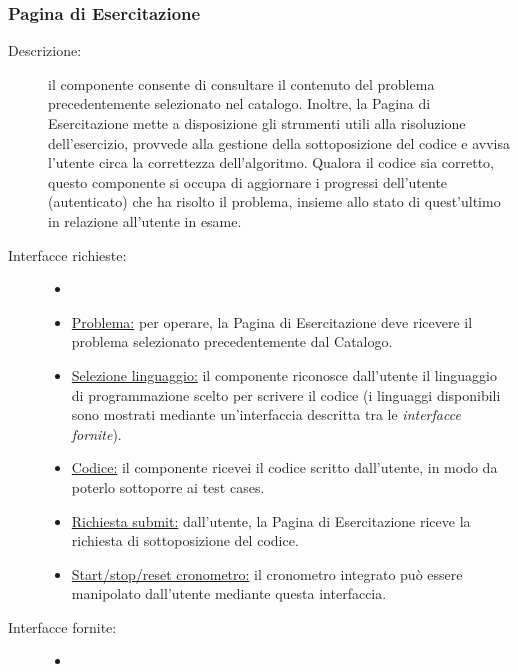 \documentclass[11pt, a4paper]{article}
\theoremstyle{definition} %
\begin{document}
\subsubsection{Pagina di Esercitazione}
\begin{description}
    \item[Descrizione:] il componente consente di consultare il contenuto del problema
    precedentemente selezionato nel catalogo. Inoltre, la Pagina di Esercitazione mette
    a disposizione gli strumenti utili alla risoluzione dell'esercizio, provvede alla
    gestione della sottoposizione del codice e avvisa l'utente circa la correttezza dell'algoritmo.
    Qualora il codice sia corretto, questo componente si occupa di aggiornare i progressi
    dell'utente (autenticato) che ha risolto il problema, insieme allo stato di quest'ultimo
    in relazione all'utente in esame.

    \item[Interfacce richieste:]
    \begin{itemize}
        \item[]

        \item \underline{Problema:} per operare, la Pagina di Esercitazione
        deve ricevere il problema selezionato precedentemente dal Catalogo.

        \item \underline{Selezione linguaggio:} il componente riconosce dall'utente il
        linguaggio di programmazione scelto per scrivere il codice (i linguaggi disponibili
        sono mostrati mediante un'interfaccia descritta tra le \textit{interfacce fornite}).

        \item \underline{Codice:} il componente ricevei il codice scritto
        dall'utente, in modo da poterlo sottoporre ai test cases.

        \item \underline{Richiesta submit:} dall'utente, la Pagina di Esercitazione
        riceve la richiesta di sottoposizione del codice.

        \item \underline{Start/stop/reset cronometro:} il cronometro integrato
        può essere manipolato dall'utente mediante questa interfaccia.
    \end{itemize}

    \item[Interfacce fornite:]
    \begin{itemize}
        \item[]


\end{itemize}
\end{description}
\end{document}
